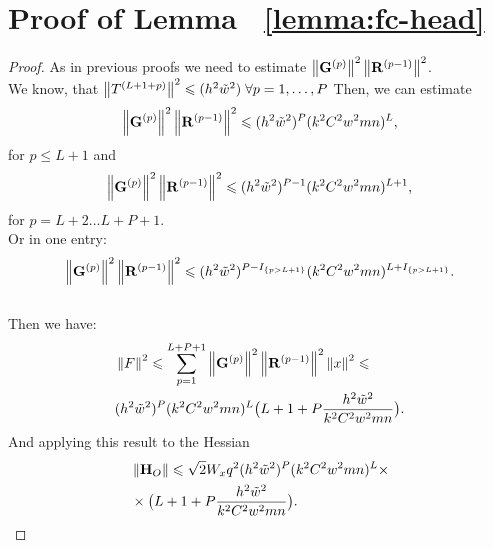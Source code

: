 \documentclass[conference]{IEEEtran}
\begin{document}
\section{Proof of Lemma ~\ref{lemma:fc-head}}\label{app:lemma:fc-head}
\begin{proof}
As in previous proofs we need to estimate $\left\|\mathbf{G}^{(p)}\right\|^2\left\|\mathbf{R}^{(p-1)}\right\|^2$. \\
We know, that $\left\|T^{(L+1+p)}\right\|^2 \leqslant (h^2\tilde{w}^2)\; \forall p = 1, \dots, P$
Then, we can estimate
\[\left\|\mathbf{G}^{(p)}\right\|^2\left\|\mathbf{R}^{(p-1)}\right\|^2 \leqslant (h^2\tilde{w}^2)^{P}(k^2C^2w^2mn)^L,\] for $p \leqslant L+1$ and \\
\[\left\|\mathbf{G}^{(p)}\right\|^2\left\|\mathbf{R}^{(p-1)}\right\|^2 \leqslant (h^2\tilde{w}^2)^{P-1}(k^2C^2w^2mn)^{L+1},\] 
for $p = L+2 \dots L+P+1$. \\
Or in one entry: \\
\[\left\|\mathbf{G}^{(p)}\right\|^2\left\|\mathbf{R}^{(p-1)}\right\|^2 \leqslant (h^2\tilde{w}^2)^{P-I_{\{p > L+1\}}}(k^2C^2w^2mn)^{L + I_{\{p > L+1\}}}.\] \\
Then we have: \\
\begin{align*}
& \left\|F\right\|^2 \leqslant \sum\limits_{p=1}^{L+P+1}\left\|\mathbf{G}^{(p)}\right\|^2\left\|\mathbf{R}^{(p-1)}\right\|^2\left\|x\right\|^2 \leqslant \\
& (h^2\tilde{w}^2)^P(k^2C^2w^2mn)^{L}\big(L+1 + P\frac{h^2\tilde{w}^2}{k^2C^2w^2mn}\big).
\end{align*}
And applying this result to the Hessian \\
\begin{align*}
& \left\|\mathbf{H}_{O}\right\| \leqslant \sqrt{2}W_{x}q^2(h^2\tilde{w}^2)^P(k^2C^2w^2mn)^L\times \\
& \times \big(L + 1 + P\frac{h^2\tilde{w}^2}{k^2C^2w^2mn}\big).
\end{align*}

\end{proof}
\end{document}
